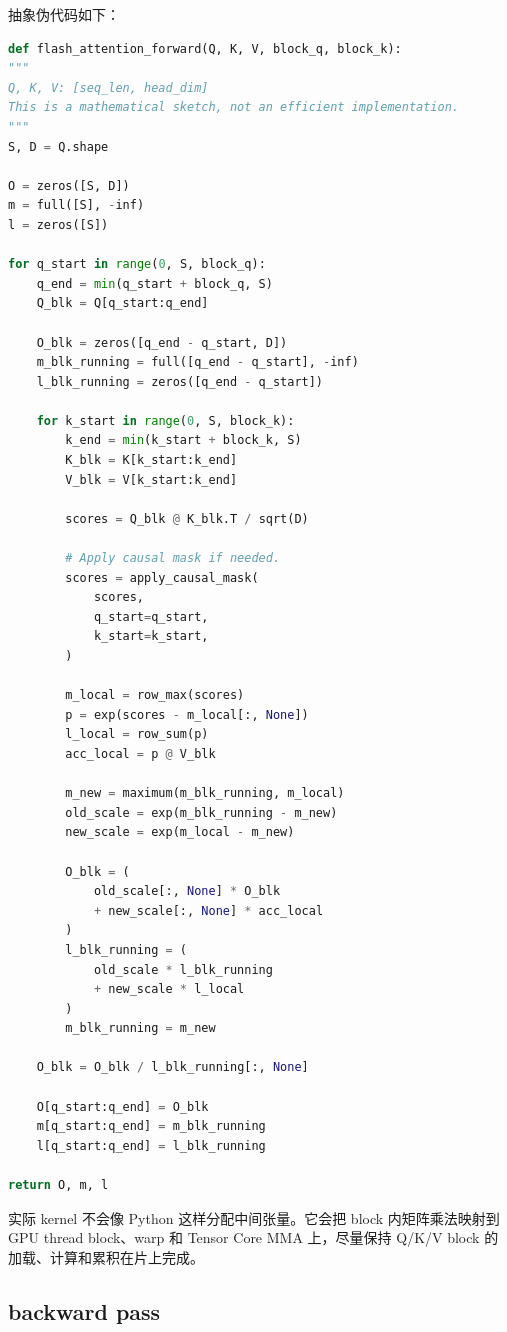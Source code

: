抽象伪代码如下：

\begin{lstlisting}[language=Python,caption={FlashAttention forward 的简化伪代码},label={lst:flashattention-forward-pseudocode}]
def flash_attention_forward(Q, K, V, block_q, block_k):
"""
Q, K, V: [seq_len, head_dim]
This is a mathematical sketch, not an efficient implementation.
"""
S, D = Q.shape

O = zeros([S, D])
m = full([S], -inf)
l = zeros([S])

for q_start in range(0, S, block_q):
    q_end = min(q_start + block_q, S)
    Q_blk = Q[q_start:q_end]

    O_blk = zeros([q_end - q_start, D])
    m_blk_running = full([q_end - q_start], -inf)
    l_blk_running = zeros([q_end - q_start])

    for k_start in range(0, S, block_k):
        k_end = min(k_start + block_k, S)
        K_blk = K[k_start:k_end]
        V_blk = V[k_start:k_end]

        scores = Q_blk @ K_blk.T / sqrt(D)

        # Apply causal mask if needed.
        scores = apply_causal_mask(
            scores,
            q_start=q_start,
            k_start=k_start,
        )

        m_local = row_max(scores)
        p = exp(scores - m_local[:, None])
        l_local = row_sum(p)
        acc_local = p @ V_blk

        m_new = maximum(m_blk_running, m_local)
        old_scale = exp(m_blk_running - m_new)
        new_scale = exp(m_local - m_new)

        O_blk = (
            old_scale[:, None] * O_blk
            + new_scale[:, None] * acc_local
        )
        l_blk_running = (
            old_scale * l_blk_running
            + new_scale * l_local
        )
        m_blk_running = m_new

    O_blk = O_blk / l_blk_running[:, None]

    O[q_start:q_end] = O_blk
    m[q_start:q_end] = m_blk_running
    l[q_start:q_end] = l_blk_running

return O, m, l

\end{lstlisting}

实际 kernel 不会像 Python 这样分配中间张量。它会把 block 内矩阵乘法映射到 GPU thread block、warp 和 Tensor Core MMA 上，尽量保持 Q/K/V block 的加载、计算和累积在片上完成。

\subsection{backward pass}
\label{subsec:flashattention-backward-pass}

